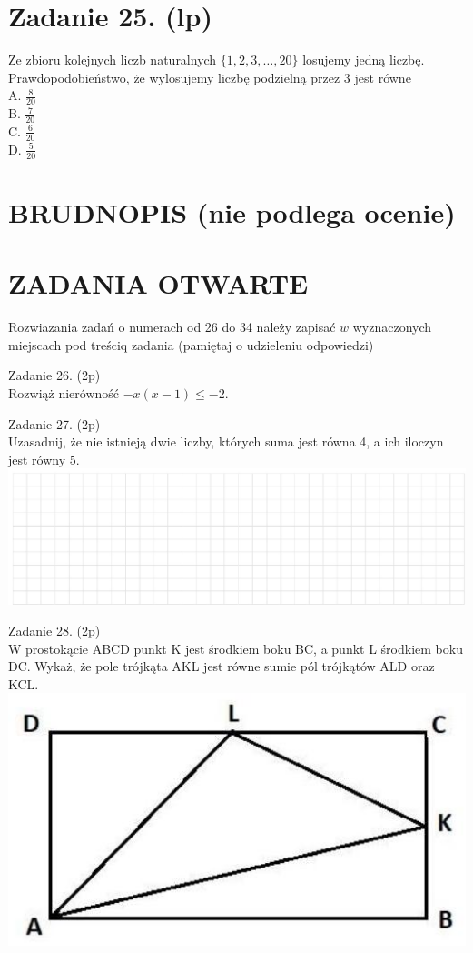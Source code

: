 \documentclass[10pt]{article}
\begin{document}
\section*{Zadanie 25. (lp)}
Ze zbioru kolejnych liczb naturalnych \(\{1,2,3, \ldots, 20\}\) losujemy jedną liczbę. Prawdopodobieństwo, że wylosujemy liczbę podzielną przez 3 jest równe\\
A. \(\frac{8}{20}\)\\
B. \(\frac{7}{20}\)\\
C. \(\frac{6}{20}\)\\
D. \(\frac{5}{20}\)

\section*{BRUDNOPIS (nie podlega ocenie)}
\section*{ZADANIA OTWARTE}
Rozwiazania zadań o numerach od 26 do 34 należy zapisać \(w\) wyznaczonych miejscach pod treściq zadania (pamiętaj o udzieleniu odpowiedzi)

Zadanie 26. (2p)\\
Rozwiąż nierówność \(-x(x-1) \leq-2\).

Zadanie 27. (2p)\\
Uzasadnij, że nie istnieją dwie liczby, których suma jest równa 4, a ich iloczyn jest równy 5.\\
\includegraphics[max width=\textwidth, center]{2024_11_21_90ea54b753259b37713ag-09(1)}

Zadanie 28. (2p)\\
W prostokącie ABCD punkt K jest środkiem boku BC, a punkt L środkiem boku DC. Wykaż, że pole trójkąta AKL jest równe sumie pól trójkątów ALD oraz KCL.\\
\includegraphics[max width=\textwidth, center]{2024_11_21_90ea54b753259b37713ag-09}
\end{document}
